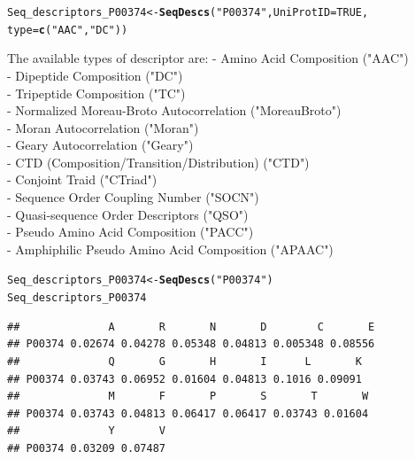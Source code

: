 \documentclass[twoside,a4wide,12pt]{article}\usepackage[]{graphicx}\usepackage[]{color}
\makeatletter
\newcommand{\hlnum}[1]{\textcolor[rgb]{0.686,0.059,0.569}{#1}}%
\newcommand{\hlstr}[1]{\textcolor[rgb]{0.192,0.494,0.8}{#1}}%
\newcommand{\hlstd}[1]{\textcolor[rgb]{0.345,0.345,0.345}{#1}}%
\newcommand{\hlkwb}[1]{\textcolor[rgb]{0.69,0.353,0.396}{#1}}%
\newcommand{\hlkwc}[1]{\textcolor[rgb]{0.333,0.667,0.333}{#1}}%
\newcommand{\hlkwd}[1]{\textcolor[rgb]{0.737,0.353,0.396}{\textbf{#1}}}%
\newenvironment{kframe}{%
 \def\at@end@of@kframe{}%
 \ifinner\ifhmode%
  \def\at@end@of@kframe{\end{minipage}}%
  \begin{minipage}{\columnwidth}%
 \fi\fi%
 \def\FrameCommand##1{\hskip\@totalleftmargin \hskip-\fboxsep
 \colorbox{shadecolor}{##1}\hskip-\fboxsep
     \hskip-\linewidth \hskip-\@totalleftmargin \hskip\columnwidth}%
 \MakeFramed {\advance\hsize-\width
   \@totalleftmargin\z@ \linewidth\hsize
   \@setminipage}}%
 {\par\unskip\endMakeFramed%
 \at@end@of@kframe}
\newenvironment{knitrout}{}{} %
\makeatother
\begin{document}
\begin{knitrout}
\color{fgcolor}\begin{kframe}
\begin{alltt}
\hlstd{Seq_descriptors_P00374} \hlkwb{<-} \hlkwd{SeqDescs}\hlstd{(}\hlstr{"P00374"}\hlstd{,} \hlkwc{UniProtID} \hlstd{=} \hlnum{TRUE}\hlstd{,}
    \hlkwc{type} \hlstd{=} \hlkwd{c}\hlstd{(}\hlstr{"AAC"}\hlstd{,} \hlstr{"DC"}\hlstd{))}
\end{alltt}
\end{kframe}
\end{knitrout}

The available types of descriptor are:\cite{protr}
- Amino Acid Composition ("AAC")\\
- Dipeptide Composition ("DC")\\
- Tripeptide Composition ("TC")\\
- Normalized Moreau-Broto Autocorrelation ("MoreauBroto")\\
- Moran Autocorrelation ("Moran")\\
- Geary Autocorrelation ("Geary")\\
- CTD (Composition/Transition/Distribution) ("CTD")\\
- Conjoint Traid ("CTriad")\\
- Sequence Order Coupling Number ("SOCN")\\
- Quasi-sequence Order Descriptors ("QSO")\\
- Pseudo Amino Acid Composition ("PACC")\\
- Amphiphilic Pseudo Amino Acid Composition ("APAAC")\\

\begin{knitrout}
\color{fgcolor}\begin{kframe}
\begin{alltt}
\hlstd{Seq_descriptors_P00374} \hlkwb{<-} \hlkwd{SeqDescs}\hlstd{(}\hlstr{"P00374"}\hlstd{)}
\hlstd{Seq_descriptors_P00374}
\end{alltt}
\begin{verbatim}
##              A       R       N       D        C       E
## P00374 0.02674 0.04278 0.05348 0.04813 0.005348 0.08556
##              Q       G       H       I      L       K
## P00374 0.03743 0.06952 0.01604 0.04813 0.1016 0.09091
##              M       F       P       S       T       W
## P00374 0.03743 0.04813 0.06417 0.06417 0.03743 0.01604
##              Y       V
## P00374 0.03209 0.07487
\end{verbatim}
\end{kframe}
\end{knitrout}
\end{document}
